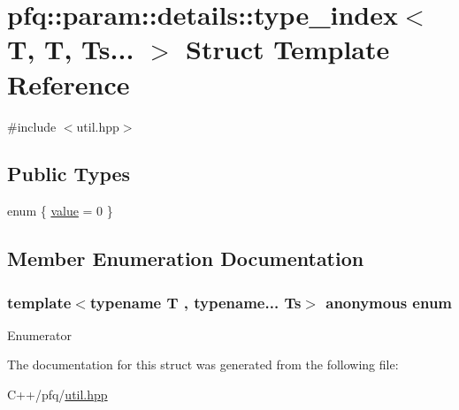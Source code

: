 \hypertarget{structpfq_1_1param_1_1details_1_1type__index_3_01T_00_01T_00_01Ts_8_8_8_01_4}{}\section{pfq\+:\+:param\+:\+:details\+:\+:type\+\_\+index$<$ T, T, Ts... $>$ Struct Template Reference}
\label{structpfq_1_1param_1_1details_1_1type__index_3_01T_00_01T_00_01Ts_8_8_8_01_4}


{\ttfamily \#include $<$util.\+hpp$>$}

\subsection*{Public Types}
\begin{DoxyCompactItemize}
\item 
enum \{ \hyperlink{structpfq_1_1param_1_1details_1_1type__index_3_01T_00_01T_00_01Ts_8_8_8_01_4_a526e52730fcbaf8cb5f30523f3f4885fa4d9cd56fc4c1815fa4b3de02e03e3e1f}{value} = 0
 \}
\end{DoxyCompactItemize}


\subsection{Member Enumeration Documentation}
\subsubsection[{\texorpdfstring{anonymous enum}{anonymous enum}}]{\setlength{\rightskip}{0pt plus 5cm}template$<$typename T , typename... Ts$>$ anonymous enum}\hypertarget{structpfq_1_1param_1_1details_1_1type__index_3_01T_00_01T_00_01Ts_8_8_8_01_4_a526e52730fcbaf8cb5f30523f3f4885f}{}\label{structpfq_1_1param_1_1details_1_1type__index_3_01T_00_01T_00_01Ts_8_8_8_01_4_a526e52730fcbaf8cb5f30523f3f4885f}
\begin{Desc}
\item[Enumerator]\par
\begin{description}
\item[{\em 
value\hypertarget{structpfq_1_1param_1_1details_1_1type__index_3_01T_00_01T_00_01Ts_8_8_8_01_4_a526e52730fcbaf8cb5f30523f3f4885fa4d9cd56fc4c1815fa4b3de02e03e3e1f}{}\label{structpfq_1_1param_1_1details_1_1type__index_3_01T_00_01T_00_01Ts_8_8_8_01_4_a526e52730fcbaf8cb5f30523f3f4885fa4d9cd56fc4c1815fa4b3de02e03e3e1f}
}]\end{description}
\end{Desc}


The documentation for this struct was generated from the following file\+:\begin{DoxyCompactItemize}
\item 
C++/pfq/\hyperlink{util_8hpp}{util.\+hpp}\end{DoxyCompactItemize}
